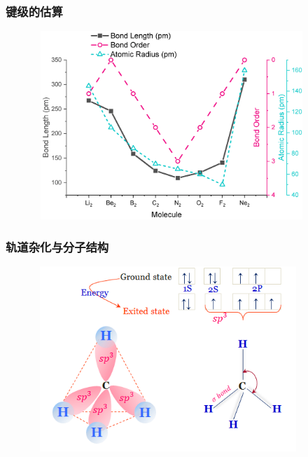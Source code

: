 \frame
{
	\frametitle{键级的估算}
\begin{figure}[h!]
\centering
\vspace{-15.5pt}
\includegraphics[height=2.80in,width=4.10in,viewport=0 0 800 550,clip]{Figures/Band-order-2.jpg}
\label{Bond_Order-2}
\end{figure}
}

\frame
{
	\frametitle{轨道杂化与分子结构}
\begin{figure}[h!]
\centering
\vspace{-10.5pt}
\includegraphics[height=2.75in,width=4.00in,viewport=0 0 520 370,clip]{Figures/methane-gas.png}
\label{Bond_Hybrid}
\end{figure}
}

